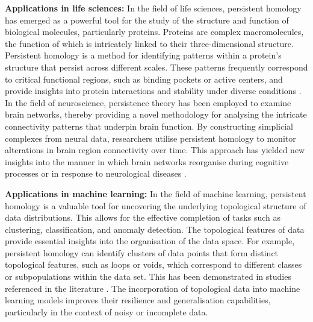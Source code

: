\textbf{Applications in life sciences:} In the field of life sciences, persistent homology has emerged as a powerful tool for the study of the structure and function of biological molecules, particularly proteins. Proteins are complex macromolecules, the function of which is intricately linked to their three-dimensional structure. Persistent homology is a method for identifying patterns within a protein's structure that persist across different scales. These patterns frequently correspond to critical functional regions, such as binding pockets or active centers, and provide insights into protein interactions and stability under diverse conditions \cite{Kovacev-Nikolic2016}. In the field of neuroscience, persistence theory has been employed to examine brain networks, thereby providing a novel methodology for analysing the intricate connectivity patterns that underpin brain function. By constructing simplicial complexes from neural data, researchers utilise persistent homology  to monitor alterations in brain region connectivity over time. This approach has yielded new insights into the manner in which brain networks reorganise during cognitive processes or in response to neurological diseases \cite{Giusti2016, unger2023simplex}.

\textbf{Applications in machine learning:} In the field of machine learning, persistent homology is a valuable tool for uncovering the underlying topological structure of data distributions. This allows for the effective completion of tasks such as clustering, classification, and anomaly detection. The topological features of data provide essential insights into the organisation of the data space. For example, persistent homology can identify clusters of data points that form distinct topological features, such as loops or voids, which correspond to different classes or subpopulations within the data set. This has been demonstrated in studies referenced in the literature \cite{Hofer2017,melodia2020persistent,melodia2021estimate,melodia2021homological}. The incorporation of topological data into machine learning models improves their resilience and generalisation capabilities, particularly in the context of noisy or incomplete data.

